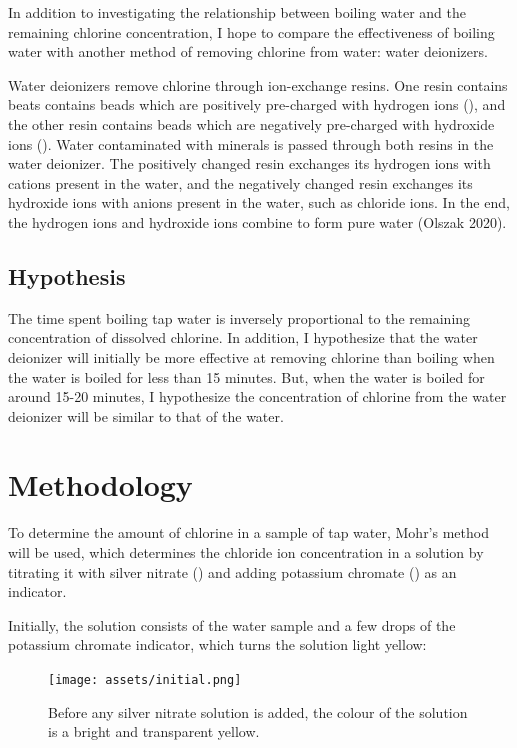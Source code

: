 \documentclass[11pt]{article}
\begin{document}
In addition to investigating the relationship between boiling water and the remaining chlorine concentration, I hope to compare the effectiveness of boiling water with another method of removing chlorine from water: water deionizers.

Water deionizers remove chlorine through ion-exchange resins. One resin contains beats contains beads which are positively pre-charged with hydrogen ions (), and the other resin contains beads which are negatively pre-charged with hydroxide ions (). Water contaminated with minerals is passed through both resins in the water deionizer. The positively changed resin exchanges its hydrogen ions with cations present in the water, and the negatively changed resin exchanges its hydroxide ions with anions present in the water, such as chloride ions. In the end, the hydrogen ions and hydroxide ions combine to form pure water  (Olszak 2020).

\subsection{Hypothesis}
The time spent boiling tap water is inversely proportional to the remaining concentration of dissolved chlorine. In addition, I hypothesize that the water deionizer will initially be more effective at removing chlorine than boiling when the water is boiled for less than 15 minutes. But, when the water is boiled for around 15-20 minutes, I hypothesize the concentration of chlorine from the water deionizer will be similar to that of the water.

\section{Methodology}

To determine the amount of chlorine in a sample of tap water, Mohr's method will be used, which determines the chloride ion concentration in a solution by titrating it with silver nitrate () and adding potassium chromate () as an indicator.

Initially, the solution consists of the water sample and a few drops of the potassium chromate indicator, which turns the solution light yellow:

\begin{figure}[H]
	\centering
	\texttt{[image: assets/initial.png]}
	\caption{Before any silver nitrate solution is added, the colour of the solution is a bright and transparent yellow.}
\end{figure}
\end{document}
